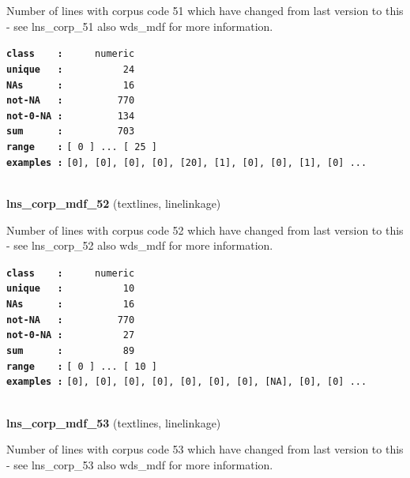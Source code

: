 \documentclass[]{article}
\begin{document}
Number of lines with corpus code 51 which have changed from last version
to this - see lns\_corp\_51 also wds\_mdf for more information.

\textbf{\texttt{class\ \ \ \ :}} \texttt{~~~~~numeric}\\
\textbf{\texttt{unique\ \ \ :}} \texttt{~~~~~~~~~~24}\\
\textbf{\texttt{NAs\ \ \ \ \ \ :}} \texttt{~~~~~~~~~~16}\\
\textbf{\texttt{not-NA\ \ \ :}} \texttt{~~~~~~~~~770}\\
\textbf{\texttt{not-0-NA\ :}} \texttt{~~~~~~~~~134}\\
\textbf{\texttt{sum\ \ \ \ \ \ :}} \texttt{~~~~~~~~~703}\\
\textbf{\texttt{range\ \ \ \ :}}
\texttt{{[}\ 0\ {]}\ ...\ {[}\ 25\ {]}}\\
\textbf{\texttt{examples\ :}}
\texttt{{[}0{]},\ {[}0{]},\ {[}0{]},\ {[}0{]},\ {[}20{]},\ {[}1{]},\ {[}0{]},\ {[}0{]},\ {[}1{]},\ {[}0{]}\ ...}\\

~

\textbf{lns\_corp\_mdf\_52} (textlines, linelinkage)

Number of lines with corpus code 52 which have changed from last version
to this - see lns\_corp\_52 also wds\_mdf for more information.

\textbf{\texttt{class\ \ \ \ :}} \texttt{~~~~~numeric}\\
\textbf{\texttt{unique\ \ \ :}} \texttt{~~~~~~~~~~10}\\
\textbf{\texttt{NAs\ \ \ \ \ \ :}} \texttt{~~~~~~~~~~16}\\
\textbf{\texttt{not-NA\ \ \ :}} \texttt{~~~~~~~~~770}\\
\textbf{\texttt{not-0-NA\ :}} \texttt{~~~~~~~~~~27}\\
\textbf{\texttt{sum\ \ \ \ \ \ :}} \texttt{~~~~~~~~~~89}\\
\textbf{\texttt{range\ \ \ \ :}}
\texttt{{[}\ 0\ {]}\ ...\ {[}\ 10\ {]}}\\
\textbf{\texttt{examples\ :}}
\texttt{{[}0{]},\ {[}0{]},\ {[}0{]},\ {[}0{]},\ {[}0{]},\ {[}0{]},\ {[}0{]},\ {[}NA{]},\ {[}0{]},\ {[}0{]}\ ...}\\

~

\textbf{lns\_corp\_mdf\_53} (textlines, linelinkage)

Number of lines with corpus code 53 which have changed from last version
to this - see lns\_corp\_53 also wds\_mdf for more information.
\end{document}
